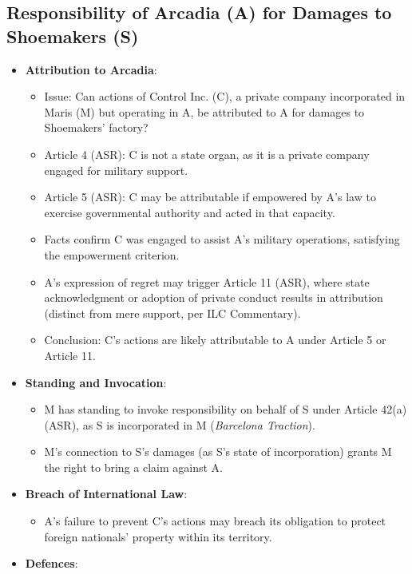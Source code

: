 \subsection{Responsibility of Arcadia (A) for Damages to Shoemakers (S)}
\begin{itemize}
    \item \textbf{Attribution to Arcadia}:
    \begin{itemize}
        \item Issue: Can actions of Control Inc. (C), a private company incorporated in Maris (M) but operating in A, be attributed to A for damages to Shoemakers’ factory?
        \item Article 4 (ASR): C is not a state organ, as it is a private company engaged for military support.
        \item Article 5 (ASR): C may be attributable if empowered by A’s law to exercise governmental authority and acted in that capacity.
        \item Facts confirm C was engaged to assist A’s military operations, satisfying the empowerment criterion.
        \item A’s expression of regret may trigger Article 11 (ASR), where state acknowledgment or adoption of private conduct results in attribution (distinct from mere support, per ILC Commentary).
        \item Conclusion: C’s actions are likely attributable to A under Article 5 or Article 11.
    \end{itemize}
    \item \textbf{Standing and Invocation}:
    \begin{itemize}
        \item M has standing to invoke responsibility on behalf of S under Article 42(a) (ASR), as S is incorporated in M (\textit{Barcelona Traction}).
        \item M’s connection to S’s damages (as S’s state of incorporation) grants M the right to bring a claim against A.
    \end{itemize}
    \item \textbf{Breach of International Law}:
    \begin{itemize}
        \item A’s failure to prevent C’s actions may breach its obligation to protect foreign nationals’ property within its territory.
    \end{itemize}
    \item \textbf{Defences}:
    \begin{itemize}

\end{itemize}
\end{itemize}
